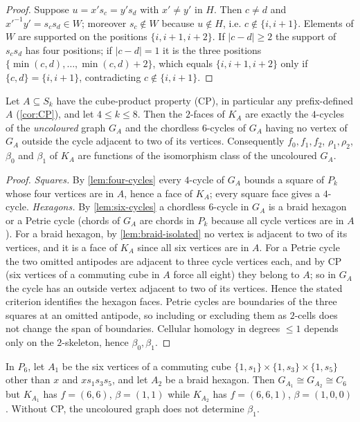 \begin{proof}
Suppose $u=x's_c=y's_d$ with $x'\ne y'$ in $H$. Then $c\ne d$ and $x'^{-1}y'=s_cs_d\in W$; moreover $s_c\notin W$ because $u\notin H$, i.e. $c\notin\{i,i+1\}$. Elements of $W$ are supported on the positions $\{i,i{+}1,i{+}2\}$. If $|c-d|\ge2$ the support of $s_cs_d$ has four positions; if $|c-d|=1$ it is the three positions $\{\min(c,d),\dots,\min(c,d)+2\}$, which equals $\{i,i+1,i+2\}$ only if $\{c,d\}=\{i,i+1\}$, contradicting $c\notin\{i,i+1\}$.
\end{proof}

\begin{theorem}\label{thm:skeleton}
Let $A\subseteq S_k$ have the cube-product property (CP), in particular any prefix-defined $A$ (\cref{cor:CP}), and let $4\le k\le8$. Then the $2$-faces of $K_A$ are exactly the $4$-cycles of the \emph{uncoloured} graph $G_A$ and the chordless $6$-cycles of $G_A$ having no vertex of $G_A$ outside the cycle adjacent to two of its vertices. Consequently $f_0,f_1,f_2$, $\rho_1,\rho_2$, $\beta_0$ and $\beta_1$ of $K_A$ are functions of the isomorphism class of the uncoloured $G_A$.
\end{theorem}
\begin{proof}
\emph{Squares.} By \cref{lem:four-cycles} every $4$-cycle of $G_A$ bounds a square of $P_k$ whose four vertices are in $A$, hence a face of $K_A$; every square face gives a $4$-cycle. \emph{Hexagons.} By \cref{lem:six-cycles} a chordless $6$-cycle in $G_A$ is a braid hexagon or a Petrie cycle (chords of $G_A$ are chords in $P_k$ because all cycle vertices are in $A$). For a braid hexagon, by \cref{lem:braid-isolated} no vertex is adjacent to two of its vertices, and it is a face of $K_A$ since all six vertices are in $A$. For a Petrie cycle the two omitted antipodes are adjacent to three cycle vertices each, and by CP (six vertices of a commuting cube in $A$ force all eight) they belong to $A$; so in $G_A$ the cycle has an outside vertex adjacent to two of its vertices. Hence the stated criterion identifies the hexagon faces. Petrie cycles are boundaries of the three squares at an omitted antipode, so including or excluding them as $2$-cells does not change the span of boundaries. Cellular homology in degrees $\le1$ depends only on the $2$-skeleton, hence $\beta_0,\beta_1$.
\end{proof}
\begin{proposition}\label{prop:petrie}
In $P_6$, let $A_1$ be the six vertices of a commuting cube $\{1,s_1\}\times\{1,s_3\}\times\{1,s_5\}$ other than $x$ and $xs_1s_3s_5$, and let $A_2$ be a braid hexagon. Then $G_{A_1}\cong G_{A_2}\cong C_6$ but $K_{A_1}$ has $f=(6,6)$, $\beta=(1,1)$ while $K_{A_2}$ has $f=(6,6,1)$, $\beta=(1,0,0)$. Without CP, the uncoloured graph does not determine $\beta_1$.
\end{proposition}
